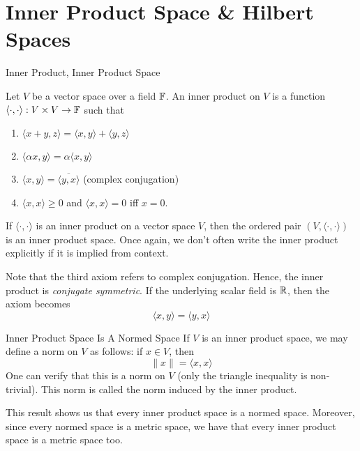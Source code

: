 \documentclass[10pt]{beamer}
\begin{document}
		\section{Inner Product Space \& Hilbert Spaces} 

		\begin{frame}{Inner Product, Inner Product Space}
				\begin{definition}
						Let $V$ be a vector space over a field $\mathbb{F}$. An \alert{inner product} on $V$ is a function $\langle \cdot, \cdot \rangle: V\times V\to \mathbb{F}$ such that 
						\begin{enumerate}
								\item $\langle x+y, z \rangle = \langle x, y\rangle + \langle y, z \rangle$ 
								\item $\langle \alpha x, y\rangle = \alpha \langle x, y \rangle$
								\item $\langle x, y \rangle = \overline{\langle y, x \rangle}$ (complex conjugation)
								\item $\langle x, x \rangle \geq 0$ and $\langle x, x \rangle = 0$ iff $x = 0$. 
						\end{enumerate}
						If $\langle \cdot, \cdot \rangle$ is an inner product on a vector space $V$, then the ordered pair $(V, \langle \cdot, \cdot \rangle)$ is an \alert{inner product space}. Once again, we don't often write the inner product explicitly if it is implied from context. 
				\end{definition}	
				Note that the third axiom refers to complex conjugation. Hence, the inner product is \emph{conjugate symmetric}. If the underlying scalar field is $\mathbb{R}$, then the axiom becomes 
				\begin{equation*}
						\langle x, y \rangle = \langle y, x \rangle
				\end{equation*}
		\end{frame}

		\begin{frame}{Inner Product Space Is A Normed Space}
				If $V$ is an inner product space, we may define a norm on $V$ as follows: if $x\in V$, then 
				\begin{equation*}
						\|x\| = \langle x, x \rangle
				\end{equation*}
				One can verify that this is a norm on $V$ (only the triangle inequality is non-trivial). This norm is called the \alert{norm induced by the inner product}.

				\begin{block}{}
						This result shows us that every inner product space is a normed space. Moreover, since every normed space is a metric space, we have that every inner product space is a metric space too. 
				\end{block}
		\end{frame}
\end{document}
